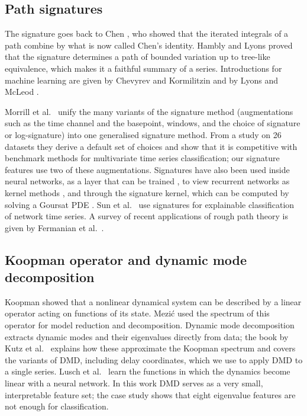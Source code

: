 \subsection{Path signatures}

The signature goes back to Chen \cite{chen1958integration}, who showed
that the iterated integrals of a path combine by what is now called Chen's
identity. Hambly and Lyons \cite{hambly2010uniqueness} proved that the
signature determines a path of bounded variation up to tree-like
equivalence, which makes it a faithful summary of a series. Introductions
for machine learning are given by Chevyrev and Kormilitzin
\cite{chevyrev2026primer} and by Lyons and McLeod \cite{lyons2022sigml}.

Morrill et al.\ \cite{morrill2020generalised} unify the many variants of
the signature method (augmentations such as the time channel and the
basepoint, windows, and the choice of signature or log-signature) into
one generalised signature method. From a study on 26 datasets they derive
a default set of choices and show that it is competitive with benchmark
methods for multivariate time series classification; our signature
features use two of these augmentations. Signatures have also been used
inside neural networks, as a layer that can be trained
\cite{kidger2019deepsig}, to view recurrent networks as kernel methods
\cite{fermanian2021framing}, and through the signature kernel, which can be
computed by solving a Goursat PDE \cite{salvi2021goursat}. Sun et al.\
\cite{sun2024recursig} use signatures for explainable classification of
network time series. A survey of recent applications of rough path theory
is given by Fermanian et al.\ \cite{fermanian2023newdirections}.

\subsection{Koopman operator and dynamic mode decomposition}

Koopman \cite{koopman1931} showed that a nonlinear dynamical system can be
described by a linear operator acting on functions of its state. Mezi\'c
\cite{mezic2005spectral} used the spectrum of this operator for model
reduction and decomposition. Dynamic mode decomposition
\cite{schmid2010dmd} extracts dynamic modes and their eigenvalues directly
from data; the book by Kutz et al.\ \cite{kutz2016dmd} explains how these
approximate the Koopman spectrum and covers the variants of DMD, including
delay coordinates, which we use to apply DMD to a single series. Lusch et al.\ \cite{lusch2018deepkoopman} learn the
functions in which the dynamics become linear with a neural network. In
this work DMD serves as a very small, interpretable feature set; the case
study shows that eight eigenvalue features are not enough for
classification.

